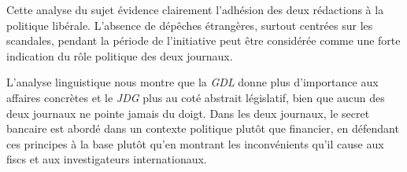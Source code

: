 \documentclass[11pt]{article}
\begin{document}
Cette analyse du sujet évidence clairement l'adhésion des deux
rédactions à la politique libérale. L'absence de dépêches étrangères,
surtout centrées sur les scandales, pendant la période de l'initiative
peut être considérée comme une forte indication du rôle politique des
deux journaux.

L'analyse linguistique nous montre que la \emph{GDL} donne plus
d'importance aux affaires concrètes et le \emph{JDG} plus au coté
abstrait législatif, bien que aucun des deux journaux ne pointe jamais
du doigt. Dans les deux journaux, le secret bancaire est abordé dans un
contexte politique plutôt que financier, en défendant ces principes à la
base plutôt qu'en montrant les inconvénients qu'il cause aux fiscs et
aux investigateurs internationaux.



\newpage



\end{document}
